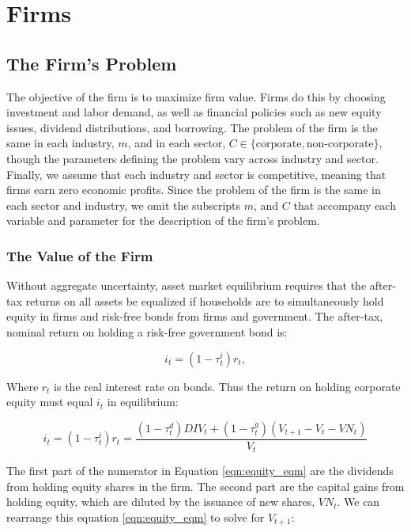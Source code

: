\chapter{Firms}
\label{chap:firms}
%



\section{The Firm's Problem}

The objective of the firm is to maximize firm value.  Firms do this by choosing investment and labor demand, as well as financial policies such as new equity issues, dividend distributions, and borrowing.  The problem of the firm is the same in each industry, $m$, and in each sector, $C\in\{\text{corporate},\text{non-corporate}\}$, though the parameters defining the problem vary across industry and sector.  Finally, we assume that each industry and sector is competitive, meaning that firms earn zero economic profits.  Since the problem of the firm is the same in each sector and industry, we omit the subscripts $m$, and $C$ that accompany each variable and parameter for the description of the firm's problem.

\subsection{The Value of the Firm}

Without aggregate uncertainty, asset market equilibrium requires that the after-tax returns on all assets be equalized if households are to simultaneously hold equity in firms and risk-free bonds from firms and government.  The after-tax, nominal return on holding a risk-free government bond is:

\begin{equation}
\label{eqn:r}
i_{t}=(1-\tau^{i}_{t})r_{t},
\end{equation}

\noindent\noindent Where $r_{t}$ is the real interest rate on bonds.  Thus the return on holding corporate equity must equal $i_{t}$ in equilibrium:

\begin{equation}
\label{eqn:equity_eqm}
i_{t}=(1-\tau^{i}_{t})r_{t}=\frac{(1-\tau^{d}_{t})DIV_{t}+(1-\tau^{g}_{t})(V_{t+1}-V_{t}-VN_{t})}{V_{t}}
\end{equation}

The first part of the numerator in Equation \ref{eqn:equity_eqm} are the dividends from holding equity shares in the firm.  The second part are the capital gains from holding equity, which are diluted by the issuance of new shares, $VN_{t}$.  We can rearrange this equation \ref{eqn:equity_eqm} to solve for $V_{t+1}$:

